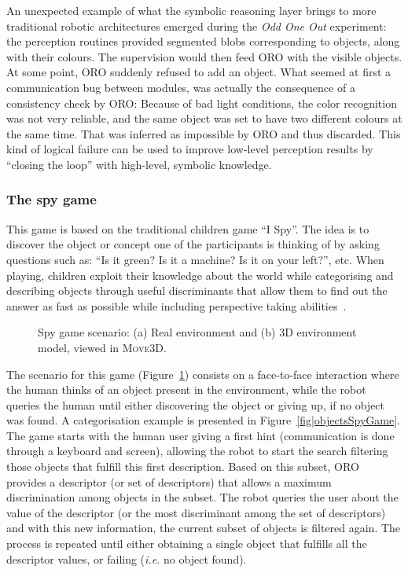 An unexpected example of what the symbolic reasoning layer brings to more
traditional robotic architectures emerged during the \emph{Odd One Out}
experiment: the perception routines provided segmented blobs corresponding to
objects, along with their colours. The supervision would then feed ORO with the
visible objects. At some point, ORO suddenly refused to add an object. What
seemed at first a communication bug between modules, was actually the
consequence of a consistency check by ORO: Because of bad light conditions, the
color recognition was not very reliable, and the same object was set to have
two different colours at the same time. That was inferred as impossible by ORO
and thus discarded. This kind of logical failure can be used to improve
low-level perception results by ``closing the loop'' with high-level, symbolic
knowledge.


\subsubsection{The spy game}
\label{spygame}

This game is based on the traditional children game ``I Spy''. The idea is to
discover the object or concept one of the participants is thinking of by asking
questions such as: ``Is it green? Is it a machine? Is it on your left?'', etc.
When playing, children exploit their knowledge about the world while
categorising and describing objects through useful discriminants that allow
them to find out the answer as fast as possible while including perspective
taking abilities~\cite{Moll2006}.

\begin{figure}
\centering

\caption{Spy game scenario: (a) Real environment and (b) 3D environment model, viewed in \textsc{Move3D}.}
\label{fig|spyGameScenario}
\end{figure}

The scenario for this game (Figure~\ref{fig|spyGameScenario}) consists on a
face-to-face interaction where the human thinks of an object present in the
environment, while the robot queries the human until either discovering the
object or giving up, if no object was found. A categorisation example is
presented in Figure~\ref{fig|objectsSpyGame}. The game starts with the human
user giving a first hint (communication is done through a keyboard and screen),
allowing the robot to start the search filtering those objects that fulfill
this first description. Based on this subset, ORO provides a descriptor (or set
of descriptors) that allows a maximum discrimination among objects in the
subset. The robot queries the user about the value of the descriptor (or the
most discriminant among the set of descriptors) and with this new information,
the current subset of objects is filtered again. The process is repeated until
either obtaining a single object that fulfills all the descriptor values, or
failing (\textit{i.e.} no object found). 

